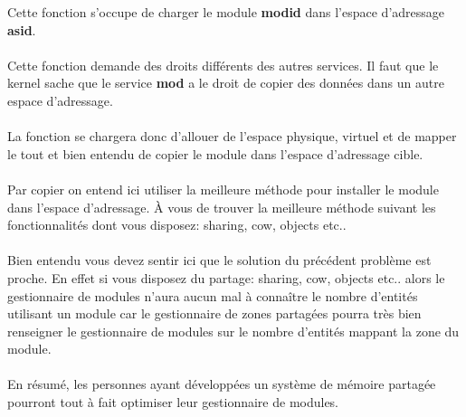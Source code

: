 \documentclass[10pt,a4wide]{article}
\begin{document}
Cette fonction s'occupe de charger le module \textbf{modid} dans l'espace
d'adressage \textbf{asid}.

\paragraph{}

Cette fonction demande des droits diff\'erents des autres services. Il faut
que le kernel sache que le service \textbf{mod} a le droit de copier
des donn\'ees dans un autre espace d'adressage.

\paragraph{}

La fonction se chargera donc d'allouer de l'espace physique, virtuel et
de mapper le tout et bien entendu de copier le module dans l'espace
d'adressage cible.

\paragraph{}

Par copier on entend ici utiliser la meilleure m\'ethode pour installer
le module dans l'espace d'adressage. \`A vous de trouver la meilleure
m\'ethode suivant les fonctionnalit\'es dont vous disposez: sharing, cow,
objects etc..

\paragraph{}

Bien entendu vous devez sentir ici que le solution du pr\'ec\'edent
probl\`eme est proche. En effet si vous disposez du partage: sharing, cow,
objects etc.. alors le gestionnaire de modules n'aura aucun mal
\`a conna\^itre le nombre d'entit\'es utilisant un module car le gestionnaire
de zones partag\'ees pourra tr\`es bien renseigner le gestionnaire de modules
sur le nombre d'entit\'es mappant la zone du module.

\paragraph{}

En r\'esum\'e, les personnes ayant d\'evelopp\'ees un syst\`eme de m\'emoire
partag\'ee pourront tout \`a fait optimiser leur gestionnaire de modules.

\paragraph{}
\end{document}
